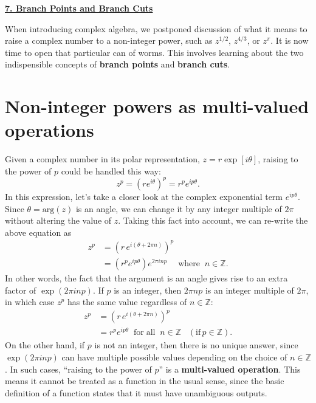 \documentclass[10pt,a4paper]{article}
\begin{document}
\setcounter{page}{46}
\noindent
\underline{\textbf{\LARGE 7. Branch Points and Branch Cuts}}
\vskip 0.1in
    
When introducing complex algebra, we postponed discussion of what it
means to raise a complex number to a non-integer power, such as
$z^{1/2}$, $z^{4/3}$, or $z^{\pi}$. It is now time to open that
particular can of worms. This involves learning about the two
indispensible concepts of \textbf{branch points} and \textbf{branch
  cuts}.

\section{Non-integer powers as multi-valued operations}
\label{non-integer-powers-as-multi-valued-operations}

Given a complex number in its polar representation, $z =
r\exp[i\theta]$, raising to the power of $p$ could be handled this
way:
\begin{equation}
  z^p = \left(re^{i\theta}\right)^p = r^p e^{ip\theta}.
\end{equation}
In this expression, let's take a closer look at the complex
exponential term $e^{ip\theta}$. Since $\theta = \mathrm{arg}(z)$ is
an angle, we can change it by any integer multiple of $2\pi$ without
altering the value of $z$. Taking this fact into account, we can
re-write the above equation as
\begin{align}
  z^p &= \left(r\,e^{i(\theta + 2\pi n)}\right)^p \\
  &= \left(r^p e^{ip\theta} \right) e^{2\pi i n p} \quad\;
  \mathrm{where}\;\; n\in\mathbb{Z}.
\end{align}
In other words, the fact that the argument is an angle gives rise to
an extra factor of $\exp(2\pi i n p)$. If $p$ is an integer, then
$2\pi n p$ is an integer multiple of $2\pi$, in which case $z^p$ has
the same value regardless of $n \in \mathbb{Z}$:
\begin{align}
  z^p &= \left(r\,e^{i(\theta + 2\pi n)}\right)^p \\
  &= r^p e^{ip\theta} \;\;\mathrm{for\;all}\;\; n\in\mathbb{Z}
  \;\;\;(\text{if}\,p\in\mathbb{Z}).
\end{align}
On the other hand, if $p$ is not an integer, then there is no unique
answer, since $\exp\left(2 \pi i np\right)$ can have multiple possible
values depending on the choice of $n \in \mathbb{Z}$. In such cases,
``raising to the power of $p$'' is a \textbf{multi-valued operation}.
This means it cannot be treated as a function in the usual sense,
since the basic definition of a function states that it must have
unambiguous outputs.
\end{document}
